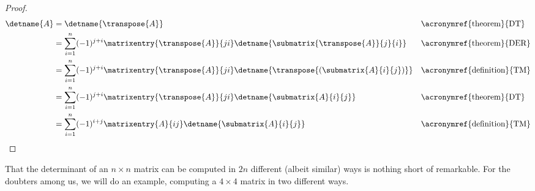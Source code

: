 %
\begin{proof}
%
\begin{align*}
\detname{A}
&=
\detname{\transpose{A}}&&\text{\acronymref{theorem}{DT}}\\
%
&=
\sum_{i=1}^{n}(-1)^{j+i}\matrixentry{\transpose{A}}{ji}\detname{\submatrix{\transpose{A}}{j}{i}}
&&\text{\acronymref{theorem}{DER}}\\
%
&=
\sum_{i=1}^{n}(-1)^{j+i}\matrixentry{\transpose{A}}{ji}\detname{\transpose{\left(\submatrix{A}{i}{j}\right)}}
&&\text{\acronymref{definition}{TM}}\\
%
&=
\sum_{i=1}^{n}(-1)^{j+i}\matrixentry{\transpose{A}}{ji}\detname{\submatrix{A}{i}{j}}
&&\text{\acronymref{theorem}{DT}}\\
%
&=
\sum_{i=1}^{n}(-1)^{i+j}\matrixentry{A}{ij}\detname{\submatrix{A}{i}{j}}
&&\text{\acronymref{definition}{TM}}
%
\end{align*}
%
\end{proof}
%
That the determinant of an $n\times n$ matrix can be computed in $2n$ different (albeit similar) ways is nothing short of remarkable.  For the doubters among us, we will do an example, computing a $4\times 4$ matrix in two different ways.
%
